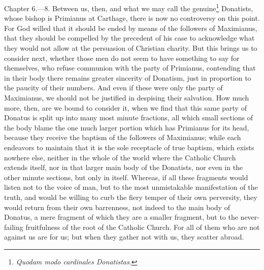 Chapter 6.—8. Between us, then, and what we may call the genuine\footnote{\par  \emph{Quodam modo cardinales Donatistas}.} Donatists, whose bishop is Primianus at Carthage, there is now no controversy on this point. For God willed that it should be ended by means of the followers of Maximianus, that they should be compelled by the precedent of his case to acknowledge what they would not allow at the persuasion of Christian charity. But this brings us to consider next, whether those men do not seem to have something to say for themselves, who refuse communion with the party of Primianus, contending that in their body there remains greater sincerity of Donatism, just in proportion to the paucity of their numbers. And even if these were only the party of Maximianus, we should not be justified in despising their salvation. How much more, then, are we bound to consider it, when we find that this same party of Donatus is split up into many most minute fractions, all which small sections of the body blame the one much larger portion which has Primianus for its head, because they receive the baptism of the followers of Maximianus; while each endeavors to maintain that it is the sole receptacle of true baptism, which exists nowhere else, neither in the whole of the world where the Catholic Church extends itself, nor in that larger main body of the Donatists, nor even in the other minute sections, but only in itself. Whereas, if all these fragments would listen not to the voice of man, but to the most unmistakable manifestation of the truth, and would be willing to curb the fiery temper of their own perversity, they would return from their own barrenness, not indeed to the main body of Donatus, a mere fragment of which they are a smaller fragment, but to the never-failing fruitfulness of the root of the Catholic Church. For all of them who are not against us are for us; but when they gather not with us, they scatter abroad.


